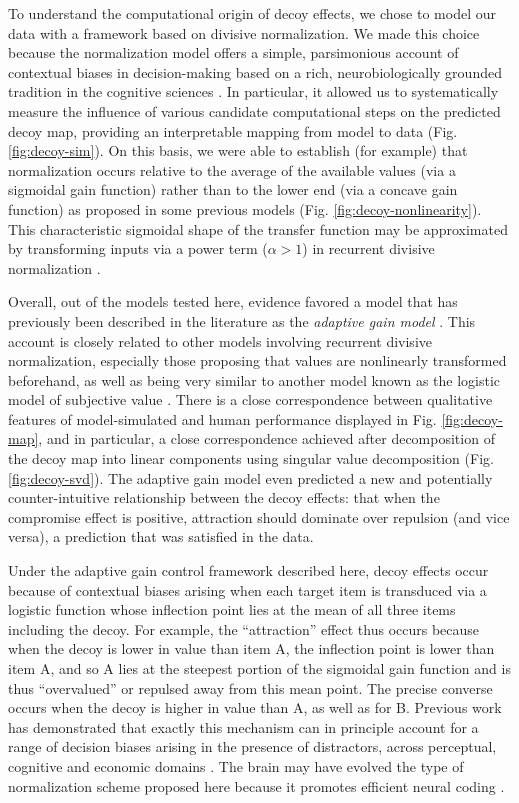\documentclass[a4paper, nobind]{templates/ociamthesis}
\begin{document}
To understand the computational origin of decoy effects, we chose to model our data with a framework based on divisive normalization. We made this choice because the normalization model offers a simple, parsimonious account of contextual biases in decision-making based on a rich, neurobiologically grounded tradition in the cognitive sciences \autocite{carandini2012,louie2013,rigoli2019,landry2021,webb2021}. In particular, it allowed us to systematically measure the influence of various candidate computational steps on the predicted decoy map, providing an interpretable mapping from model to data (Fig. \ref{fig:decoy-sim}). On this basis, we were able to establish (for example) that normalization occurs relative to the average of the available values (via a sigmoidal gain function) rather than to the lower end (via a concave gain function) as proposed in some previous models (Fig. \ref{fig:decoy-nonlinearity}). This characteristic sigmoidal shape of the transfer function may be approximated by transforming inputs via a power term (\(\alpha>1\)) in recurrent divisive normalization \autocite{daviet2018,webb2021}.

Overall, out of the models tested here, evidence favored a model that has previously been described in the literature as the \emph{adaptive gain model} \autocite{cheadle2014,li2018}. This account is closely related to other models involving recurrent divisive normalization, especially those proposing that values are nonlinearly transformed beforehand, as well as being very similar to another model known as the logistic model of subjective value \autocite{rigoli2019}. There is a close correspondence between qualitative features of model-simulated and human performance displayed in Fig. \ref{fig:decoy-map}, and in particular, a close correspondence achieved after decomposition of the decoy map into linear components using singular value decomposition (Fig. \ref{fig:decoy-svd}). The adaptive gain model even predicted a new and potentially counter-intuitive relationship between the decoy effects: that when the compromise effect is positive, attraction should dominate over repulsion (and vice versa), a prediction that was satisfied in the data.

Under the adaptive gain control framework described here, decoy effects occur because of contextual biases arising when each target item is transduced via a logistic function whose inflection point lies at the mean of all three items including the decoy. For example, the ``attraction'' effect thus occurs because when the decoy is lower in value than item A, the inflection point is lower than item A, and so A lies at the steepest portion of the sigmoidal gain function and is thus ``overvalued'' or repulsed away from this mean point. The precise converse occurs when the decoy is higher in value than A, as well as for B. Previous work has demonstrated that exactly this mechanism can in principle account for a range of decision biases arising in the presence of distractors, across perceptual, cognitive and economic domains \autocite{li2018}. The brain may have evolved the type of normalization scheme proposed here because it promotes efficient neural coding \autocite{summerfield2015,summerfield2020}.
\end{document}
